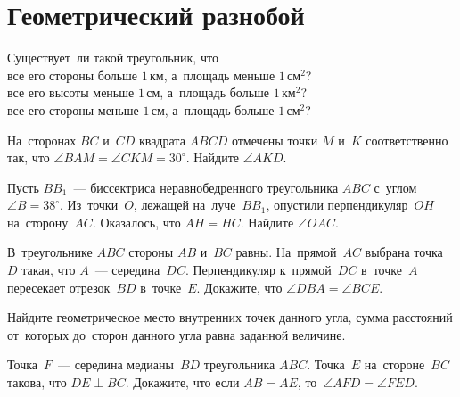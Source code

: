 
\section*{Геометрический разнобой}


\begin{problems}

\item
Существует~ли такой треугольник, что
\\
\sp
все его стороны больше $1\,\text{км}$, а~площадь меньше $1\,\text{см}^2$?
\\
\sp
все его высоты меньше $1\,\text{см}$, а~площадь больше $1\,\text{км}^2$?
\\
\sp
все его стороны меньше $1\,\text{см}$, а~площадь больше $1\,\text{см}^2$?

\item
На~сторонах $BC$ и~$CD$ квадрата $ABCD$ отмечены точки $M$ и~$K$ соответственно
так, что $\angle BAM = \angle CKM = 30^{\circ}$.
Найдите $\angle AKD$.

\item
Пусть $B B_1$~--- биссектриса неравнобедренного треугольника $ABC$ с~углом
$\angle B = 38^{\circ}$.
Из~точки~$O$, лежащей на~луче~$B B_1$, опустили перпендикуляр~$OH$
на~сторону~$AC$.
Оказалось, что $AH = HC$.
Найдите $\angle OAC$.


\item
В~треугольнике $ABC$ стороны $AB$ и~$BC$ равны.
На~прямой~$AC$ выбрана точка~$D$ такая, что $A$~--- середина~$DC$.
Перпендикуляр к~прямой~$DC$ в~точке~$A$ пересекает отрезок~$BD$ в~точке~$E$.
Докажите, что $\angle DBA = \angle BCE.$

\item
Найдите геометрическое место внутренних точек данного угла, сумма расстояний
от~которых до~сторон данного угла равна заданной величине.

\item
Точка~$F$~--- середина медианы~$BD$ треугольника $ABC$.
Точка~$E$ на~стороне~$BC$ такова, что $DE \perp BC$.
Докажите, что если $AB = AE$, то~$\angle AFD = \angle FED$.


\end{problems}
